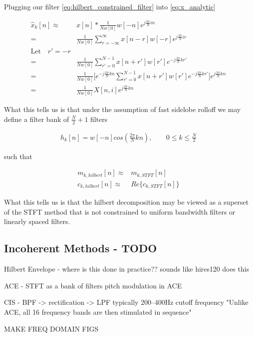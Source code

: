 \documentclass [11pt, proquest] {uwthesis}[2015/03/03]
\begin{document}
Plugging our filter \ref{eq:hilbert_constrained_filter} into \ref{eq:x_analytic}

\begin{align}
\widehat{x}_k[n] \approx& x[n] * \frac{1}{Nw[0]}w[-n]e^{j\frac{2\pi}{N}in} \nonumber \\
=& \frac{1}{Nw[0]}\sum\limits_{r=-\infty}^{\infty}x[n - r] w[-r] e^{j\frac{2\pi}{N}ir} \nonumber \\
\textrm{Let} \quad r' = -r \nonumber \\
=& \frac{1}{Nw[0]}\sum\limits_{r'=0}^{N-1} x[n + r'] w[r'] e^{-j\frac{2\pi}{N}kr'} \nonumber \\
=& \frac{1}{Nw[0]}\bigg[e^{-j\frac{2\pi}{N}kn} \sum\limits_{r'=0}^{N-1} x[n + r'] w[r'] e^{-j\frac{2\pi}{N}kr'}\bigg]e^{j\frac{2\pi}{N}kn} \nonumber \\
=& \frac{1}{Nw[0]}X[n,i]e^{j\frac{2\pi}{N}kn}
\end{align}

What this tells us is that under the assumption of fast sidelobe rolloff we may define a filter bank of $\frac{N}{2} + 1$ filters

\begin{align}
h_k[n] = w[-n]cos(\frac{2\pi}{N}kn), \qquad 0 \leq k \leq \frac{N}{2}
\end{align}

such that

\begin{align}
m_{k,hilbert}[n] \approx& m_{k,STFT}[n] \\
c_{k,hilbert}[n] \approx& Re\{c_{k,STFT}[n]\}
\end{align}

What this tells us is that the hilbert decomposition may be viewed as a superset of the STFT method that is not constrained to uniform bandwidth filters or linearly spaced filters.

\subsection{Incoherent Methods - TODO}

Hilbert Envelope - where is this done in practice??
    sounds like hires120 does this

ACE - STFT as a bank of filters
pitch modulation in ACE


CIS - BPF -> rectification -> LPF   
    typically 200–400Hz cutoff frequency
    "Unlike ACE, all 16 frequency bands are then stimulated in sequence"


MAKE FREQ DOMAIN FIGS
\end{document}
